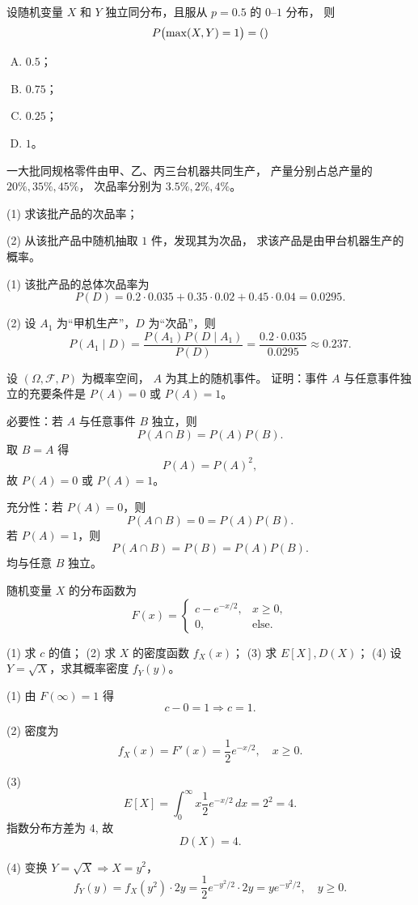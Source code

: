 \begin{homework}[4]
设随机变量 $X$ 和 $Y$ 独立同分布，且服从 $p=0.5$ 的 $0$--$1$ 分布，
则
\[
P\bigl(\max(X,Y)=1\bigr) = (\hfill)
\]

\begin{enumerate}[(A)]
  \item $0.5$；
  \item $0.75$；
  \item $0.25$；
  \item $1$。
\end{enumerate}
\end{homework}
\begin{homework}[2]
一大批同规格零件由甲、乙、丙三台机器共同生产，
产量分别占总产量的 $20\%, 35\%, 45\%$，
次品率分别为 $3.5\%, 2\%, 4\%$。

(1) 求该批产品的次品率；

(2) 从该批产品中随机抽取 $1$ 件，发现其为次品，
求该产品是由甲台机器生产的概率。
\begin{solution}
(1) 该批产品的总体次品率为  
\[
P(D)=0.2\cdot0.035+0.35\cdot0.02+0.45\cdot0.04
=0.0295.
\]

(2) 设 $A_1$ 为“甲机生产”，$D$ 为“次品”，则  
\[
P(A_1\mid D)=\frac{P(A_1)P(D\mid A_1)}
{P(D)}
=\frac{0.2\cdot0.035}{0.0295}
\approx0.237.
\]
\end{solution}
\end{homework}
\begin{homework}[3]
设 $(\Omega,\mathcal F,P)$ 为概率空间，
$A$ 为其上的随机事件。
证明：事件 $A$ 与任意事件独立的充要条件是  
$P(A)=0$ 或 $P(A)=1$。
\begin{solution}
必要性：若 $A$ 与任意事件 $B$ 独立，则  
\[
P(A\cap B)=P(A)P(B).
\]
取 $B=A$ 得  
\[
P(A)=P(A)^2,
\]
故 $P(A)=0$ 或 $P(A)=1$。

充分性：若 $P(A)=0$，则  
\[
P(A\cap B)=0=P(A)P(B).
\]
若 $P(A)=1$，则  
\[
P(A\cap B)=P(B)=P(A)P(B).
\]
均与任意 $B$ 独立。
\end{solution}
\end{homework}
\begin{homework}[4]
随机变量 $X$ 的分布函数为
\[
F(x)=
\begin{cases}
c-e^{-x/2}, & x\ge0,\\
0, & \text{else}.
\end{cases}
\]

(1) 求 $c$ 的值；  
(2) 求 $X$ 的密度函数 $f_X(x)$；  
(3) 求 $E[X], D(X)$；  
(4) 设 $Y=\sqrt{X}$，求其概率密度 $f_Y(y)$。
\begin{solution}
(1) 由 $F(\infty)=1$ 得  
\[
c-0=1 \Rightarrow c=1.
\]

(2) 密度为  
\[
f_X(x)=F'(x)=\frac12 e^{-x/2},\quad x\ge0.
\]

(3)  
\[
E[X]=\int_0^\infty x\frac12 e^{-x/2}\,dx=2^2=4.
\]
指数分布方差为 $4$, 故  
\[
D(X)=4.
\]

(4) 变换 $Y=\sqrt X\Rightarrow X=y^2$，  
\[
f_Y(y)=f_X(y^2)\cdot 2y
=\frac12 e^{-y^2/2}\cdot2y
=ye^{-y^2/2},\quad y\ge0.
\]
\end{solution}
\end{homework}

